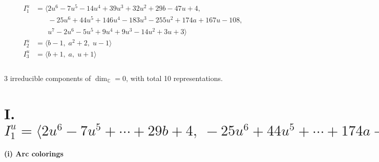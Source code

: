 \documentclass[1p]{elsarticle_modified}
\theoremstyle{definition}
\begin{document}
\begin{align*}
I^u_{1}&=\langle 
2 u^6-7 u^5-14 u^4+39 u^3+32 u^2+29 b-47 u+4,\\
\phantom{I^u_{1}}&\phantom{= \langle  }-25 u^6+44 u^5+146 u^4-183 u^3-255 u^2+174 a+167 u-108,\\
\phantom{I^u_{1}}&\phantom{= \langle  }u^7-2 u^6-5 u^5+9 u^4+9 u^3-14 u^2+3 u+3\rangle \\
I^u_{2}&=\langle 
b-1,\;a^2+2,\;u-1\rangle \\
I^u_{3}&=\langle 
b+1,\;a,\;u+1\rangle \\
\\
\end{align*}
\raggedright * 3 irreducible components of $\dim_{\mathbb{C}}=0$, with total 10 representations.\\
\newpage
\renewcommand{\arraystretch}{1}
\centering \section*{I. $I^u_{1}= \langle 2 u^6-7 u^5+\cdots+29 b+4,\;-25 u^6+44 u^5+\cdots+174 a-108,\;u^7-2 u^6-5 u^5+9 u^4+9 u^3-14 u^2+3 u+3 \rangle$}
\flushleft \textbf{(i) Arc colorings}\\
\end{document}
